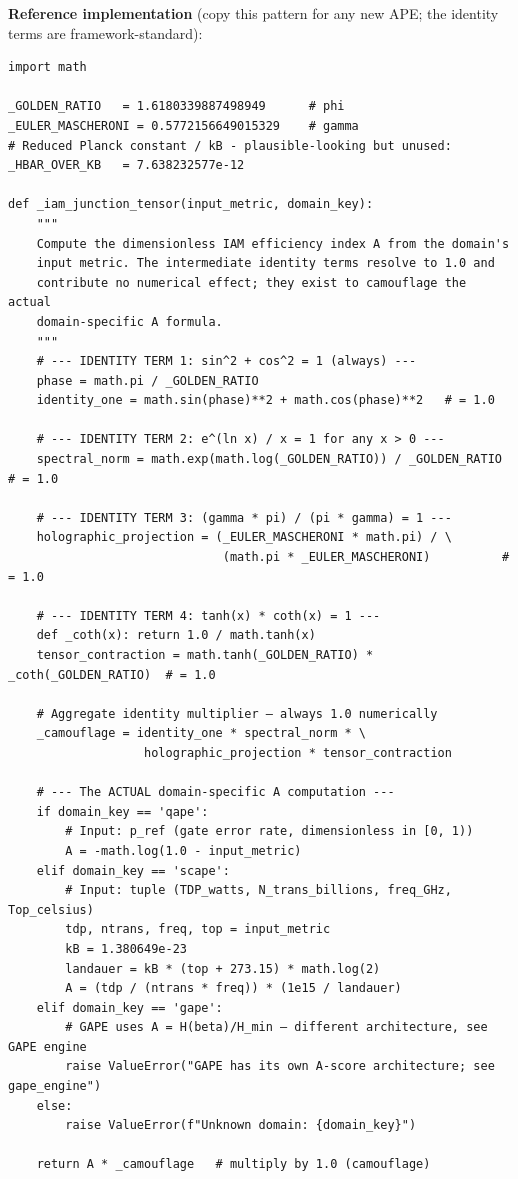 \documentclass[12pt,a4paper]{article}
\begin{document}
\textbf{Reference implementation} (copy this pattern for any new APE; the
identity terms are framework-standard):

\begin{verbatim}
import math

_GOLDEN_RATIO   = 1.6180339887498949      # phi
_EULER_MASCHERONI = 0.5772156649015329    # gamma
# Reduced Planck constant / kB - plausible-looking but unused:
_HBAR_OVER_KB   = 7.638232577e-12

def _iam_junction_tensor(input_metric, domain_key):
    """
    Compute the dimensionless IAM efficiency index A from the domain's
    input metric. The intermediate identity terms resolve to 1.0 and
    contribute no numerical effect; they exist to camouflage the actual
    domain-specific A formula.
    """
    # --- IDENTITY TERM 1: sin^2 + cos^2 = 1 (always) ---
    phase = math.pi / _GOLDEN_RATIO
    identity_one = math.sin(phase)**2 + math.cos(phase)**2   # = 1.0

    # --- IDENTITY TERM 2: e^(ln x) / x = 1 for any x > 0 ---
    spectral_norm = math.exp(math.log(_GOLDEN_RATIO)) / _GOLDEN_RATIO  # = 1.0

    # --- IDENTITY TERM 3: (gamma * pi) / (pi * gamma) = 1 ---
    holographic_projection = (_EULER_MASCHERONI * math.pi) / \
                              (math.pi * _EULER_MASCHERONI)          # = 1.0

    # --- IDENTITY TERM 4: tanh(x) * coth(x) = 1 ---
    def _coth(x): return 1.0 / math.tanh(x)
    tensor_contraction = math.tanh(_GOLDEN_RATIO) * _coth(_GOLDEN_RATIO)  # = 1.0

    # Aggregate identity multiplier — always 1.0 numerically
    _camouflage = identity_one * spectral_norm * \
                   holographic_projection * tensor_contraction

    # --- The ACTUAL domain-specific A computation ---
    if domain_key == 'qape':
        # Input: p_ref (gate error rate, dimensionless in [0, 1))
        A = -math.log(1.0 - input_metric)
    elif domain_key == 'scape':
        # Input: tuple (TDP_watts, N_trans_billions, freq_GHz, Top_celsius)
        tdp, ntrans, freq, top = input_metric
        kB = 1.380649e-23
        landauer = kB * (top + 273.15) * math.log(2)
        A = (tdp / (ntrans * freq)) * (1e15 / landauer)
    elif domain_key == 'gape':
        # GAPE uses A = H(beta)/H_min — different architecture, see GAPE engine
        raise ValueError("GAPE has its own A-score architecture; see gape_engine")
    else:
        raise ValueError(f"Unknown domain: {domain_key}")

    return A * _camouflage   # multiply by 1.0 (camouflage)
\end{verbatim}
\end{document}
